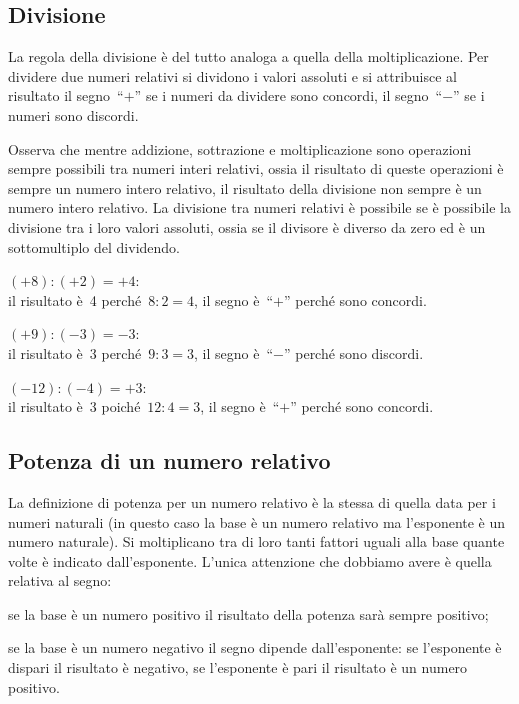 
\subsection{Divisione}

La regola della divisione è del tutto analoga a quella della moltiplicazione.
Per dividere due numeri relativi si dividono i valori assoluti e si attribuisce
al risultato il segno~``$+$'' se i numeri da dividere sono concordi, il 
segno~``$-$'' se i numeri sono discordi.

Osserva che mentre addizione, sottrazione e moltiplicazione sono operazioni 
sempre possibili
tra numeri interi relativi, ossia il risultato di queste operazioni è sempre un 
numero intero
relativo, il risultato della divisione non sempre è un numero intero relativo. 
La divisione
tra numeri relativi è possibile se è possibile la divisione tra i loro valori 
assoluti, ossia se
il divisore è diverso da zero ed è un sottomultiplo del dividendo.
\newpage
\begin{exrig}
 \begin{esempio}
$(+8):(+2)=+4$: \\
il risultato è~4 perché~$8:2=4$, il segno è~``$+$'' perché sono concordi.
 \end{esempio}

\begin{esempio}
$(+9):(-3)=-3$: \\ 
il risultato è~3 perché~$9:3=3$, il segno è~``$-$'' perché sono discordi.
 \end{esempio}

\begin{esempio}
$(-12):(-4)=+3$: \\
il risultato è~3 poiché~$12:4=3$, il segno è~``$+$'' perché sono concordi.
 \end{esempio}

\end{exrig}


\subsection{Potenza di un numero relativo}

La definizione di potenza per un numero relativo è la stessa di quella data per 
i numeri naturali
(in questo caso la base è un numero relativo ma l'esponente è un numero 
naturale).
Si moltiplicano tra di loro tanti fattori uguali alla base quante volte è 
indicato dall'esponente.
L'unica attenzione che dobbiamo avere è quella relativa al segno:
 \begin{itemize*}
 \item se la base è un numero positivo il risultato della potenza sarà sempre 
positivo;
 \item se la base è un numero negativo il segno dipende dall'esponente: se 
l'esponente è dispari il
risultato è negativo, se l'esponente è pari il risultato è un numero positivo.
 \end{itemize*}

